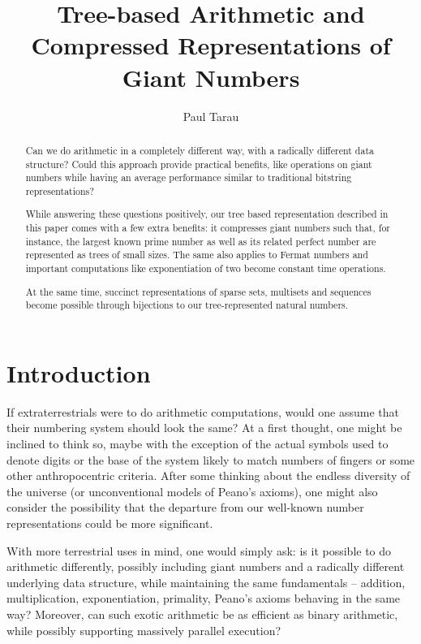 \documentclass{TOOLS/llncs}
\title{
   Tree-based Arithmetic and Compressed Representations of Giant Numbers
}
\author{Paul Tarau}
\institute{
   Department of Computer Science and Engineering\\
   University of North Texas\\
   {\em e-mail: tarau@cs.unt.edu}
}
\begin{document}
\maketitle
\date{}



\begin{abstract}
Can we do arithmetic in a completely different way, 
with a radically different data structure?  
Could this approach provide practical benefits,
like operations on giant numbers while 
having an average performance similar to traditional 
bitstring representations?

While  answering these questions positively, 
our tree based representation described in this paper
comes with a few extra benefits:
it compresses giant numbers such that, for instance,
the largest known prime number as well
as its related perfect number are represented as trees of small sizes.
The same also applies to Fermat numbers and important computations like
exponentiation of two become constant time operations. 

At the same time,
succinct representations of sparse sets, multisets and sequences become
possible through bijections to our tree-represented natural numbers.
\end{abstract}

\section{Introduction}
If extraterrestrials were to do arithmetic computations, would one assume that
their numbering system should look the same?  At a first thought, 
one might be inclined to think so, maybe with the exception of the actual 
symbols used to denote digits or the base of the system likely to match numbers of fingers or some other anthropocentric criteria. 
After some thinking about the endless diversity of the universe (or unconventional models of Peano's axioms), 
one might also consider the possibility that
the departure from our well-known number representations could be more significant.

With more terrestrial uses in mind, one would simply ask: is it possible to do arithmetic  differently, possibly including giant numbers and a radically different underlying data structure, while maintaining the same fundamentals -- addition, multiplication, exponentiation, primality, Peano's axioms behaving in the same way?
Moreover, can such exotic arithmetic be as efficient as binary arithmetic, 
while possibly supporting massively parallel execution?
\end{document}
